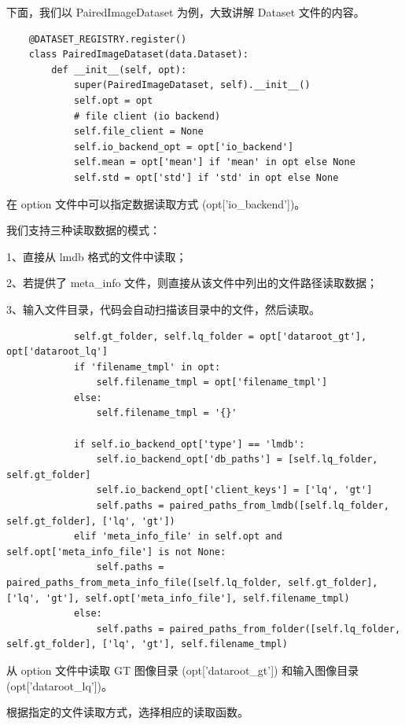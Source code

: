 \documentclass[../main.tex]{subfiles}
\begin{document}
    下面，我们以 PairedImageDataset 为例，大致讲解 Dataset 文件的内容。
    \begin{verbatim}
    @DATASET_REGISTRY.register()
    class PairedImageDataset(data.Dataset):
        def __init__(self, opt):
            super(PairedImageDataset, self).__init__()
            self.opt = opt
            # file client (io backend)
            self.file_client = None
            self.io_backend_opt = opt['io_backend']
            self.mean = opt['mean'] if 'mean' in opt else None
            self.std = opt['std'] if 'std' in opt else None
    \end{verbatim}

    在 option 文件中可以指定数据读取方式 (opt['io\_backend'])。

    我们支持三种读取数据的模式：

    1、直接从 lmdb 格式的文件中读取；

    2、若提供了 meta\_info 文件，则直接从该文件中列出的文件路径读取数据；

    3、输入文件目录，代码会自动扫描该目录中的文件，然后读取。


    \begin{verbatim}
            self.gt_folder, self.lq_folder = opt['dataroot_gt'], opt['dataroot_lq']
            if 'filename_tmpl' in opt:
                self.filename_tmpl = opt['filename_tmpl']
            else:
                self.filename_tmpl = '{}'

            if self.io_backend_opt['type'] == 'lmdb':
                self.io_backend_opt['db_paths'] = [self.lq_folder, self.gt_folder]
                self.io_backend_opt['client_keys'] = ['lq', 'gt']
                self.paths = paired_paths_from_lmdb([self.lq_folder, self.gt_folder], ['lq', 'gt'])
            elif 'meta_info_file' in self.opt and self.opt['meta_info_file'] is not None:
                self.paths = paired_paths_from_meta_info_file([self.lq_folder, self.gt_folder], ['lq', 'gt'], self.opt['meta_info_file'], self.filename_tmpl)
            else:
                self.paths = paired_paths_from_folder([self.lq_folder, self.gt_folder], ['lq', 'gt'], self.filename_tmpl)
    \end{verbatim}

    从 option 文件中读取 GT 图像目录 (opt['dataroot\_gt']) 和输入图像目录 (opt['dataroot\_lq'])。

    根据指定的文件读取方式，选择相应的读取函数。
\end{document}
